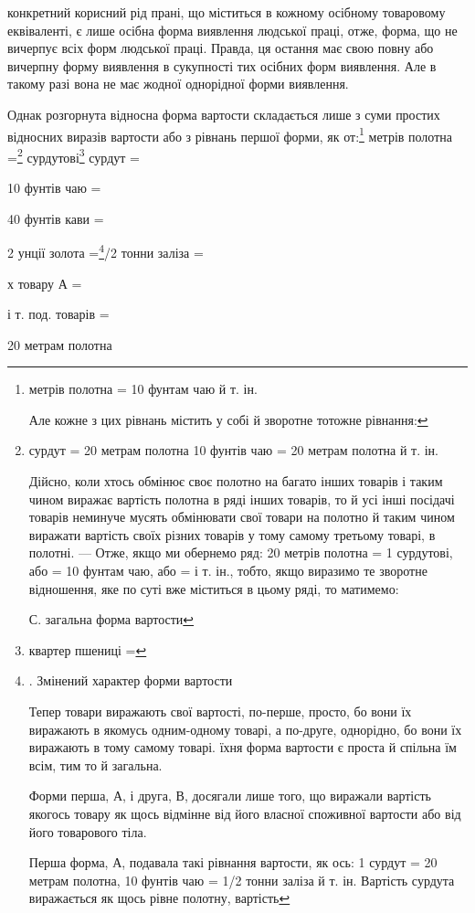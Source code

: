 конкретний корисний рід прані, що міститься в кожному осібному
товаровому еквіваленті, є лише осібна форма виявлення людської
праці, отже, форма, що не вичерпує всіх форм людської праці.
Правда, ця остання має свою повну або вичерпну форму виявлення
в сукупності тих осібних форм виявлення. Але в такому разі вона
не має жодної однорідної форми виявлення.

Однак розгорнута відносна форма вартости складається лише
з суми простих відносних виразів вартости або з рівнань першої
форми, як от:\footnote{
метрів полотна = 10 фунтам чаю й т. ін.

Але кожне з цих рівнань містить у собі й зворотне тотожне
рівнання:
} метрів полотна =\footnote{
сурдут = 20 метрам полотна
10 фунтів чаю = 20 метрам полотна й т. ін.

Дійсно, коли хтось обмінює своє полотно на багато інших товарів
і таким чином виражає вартість полотна в ряді інших товарів,
то й усі інші посідачі товарів неминуче мусять обмінювати
свої товари на полотно й таким чином виражати вартість своїх
різних товарів у тому самому третьому товарі, в полотні. — Отже,
якщо ми обернемо ряд: 20 метрів полотна = 1 сурдутові, або =
10 фунтам чаю, або = і т. ін., тобто, якщо виразимо те зворотне
відношення, яке по суті вже міститься в цьому ряді, то матимемо:

С. загальна форма вартости
} сурдутові\footnote{
квартер пшениці =
} сурдут =

10 фунтів чаю =

40 фунтів кави =

2    унції золота =\footnote{
. Змінений характер форми вартости

Тепер товари виражають свої вартості, по-перше, просто, бо
вони їх виражають в якомусь одним-одному товарі, а по-друге,
однорідно, бо вони їх виражають в тому самому товарі. їхня форма
вартости є проста й спільна їм всім, тим то й загальна.

Форми перша, А, і друга, В, досягали лише того, що виражали
вартість якогось товару як щось відмінне від його власної
споживної вартости або від його товарового тіла.

Перша форма, А, подавала такі рівнання вартости, як ось: 1 сурдут
= 20 метрам полотна, 10 фунтів чаю = 1/2 тонни заліза й т. ін.
Вартість сурдута виражається як щось рівне полотну, вартість
}/2 тонни заліза =

х товару А =

і т. под. товарів =

20 метрам полотна